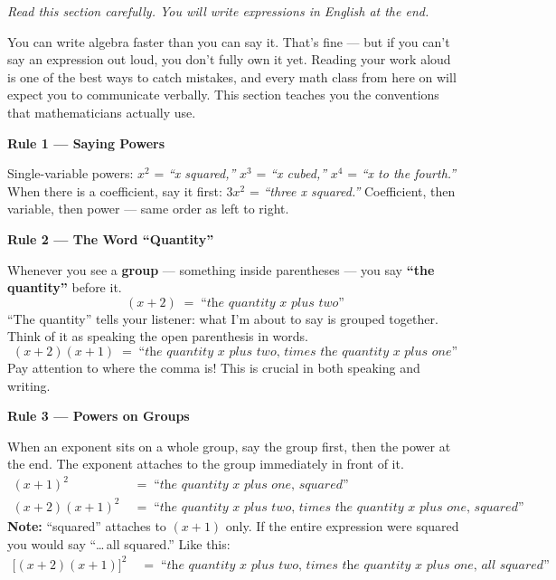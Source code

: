 \documentclass[12pt]{article}
\begin{document}
\textit{Read this section carefully.
You will write expressions in English at the end.}

\bigskip
You can write algebra faster than you can say it. That's fine --- but if you
can't say an expression out loud, you don't fully own it yet. Reading your work
aloud is one of the best ways to catch mistakes, and every math class from here
on will expect you to communicate verbally. This section teaches you the
conventions that mathematicians actually use.

\bigskip
\noindent\textbf{Rule 1 --- Saying Powers}

Single-variable powers: $x^2$ = \textit{``x squared,''} $x^3$ = \textit{``x cubed,''}
$x^4$ = \textit{``x to the fourth.''} When there is a coefficient, say it first:
$3x^2$ = \textit{``three x squared.''} Coefficient, then variable, then power ---
same order as left to right.

\bigskip
\noindent\textbf{Rule 2 --- The Word ``Quantity''}

Whenever you see a \textbf{group} --- something inside parentheses --- you say
\textbf{``the quantity''} before it.
\[
  (x+2) \;=\; \textit{``the quantity } x \textit{ plus two''}
\]
``The quantity'' tells your listener: what I'm about to say is grouped together.
Think of it as speaking the open parenthesis in words.
\[
  (x+2)(x+1) \;=\;
  \textit{``the quantity } x \textit{ plus two, times the quantity }
  x \textit{ plus one''}
\]
Pay attention to where the comma is! This is crucial in both speaking and writing.

\bigskip
\noindent\textbf{Rule 3 --- Powers on Groups}

When an exponent sits on a whole group, say the group first, then the power at
the end. The exponent attaches to the group immediately in front of it.
\begin{align*}
  (x+1)^2 &\;=\; \textit{``the quantity } x \textit{ plus one, squared''} \\[4pt]
  (x+2)(x+1)^2 &\;=\;
    \textit{``the quantity } x \textit{ plus two, times the quantity }
    x \textit{ plus one, squared''} 
\end{align*}
\textbf{Note:} ``squared'' attaches to $(x+1)$ only. If the entire expression
were squared you would say ``\ldots\,all squared.'' Like this:
\begin{align*}
    \bigl[(x+2)(x+1)\bigr]^2 &\;=\;
    \textit{``the quantity } x \textit{ plus two, times the quantity }
    x \textit{ plus one, all squared''}
\end{align*}
\end{document}
